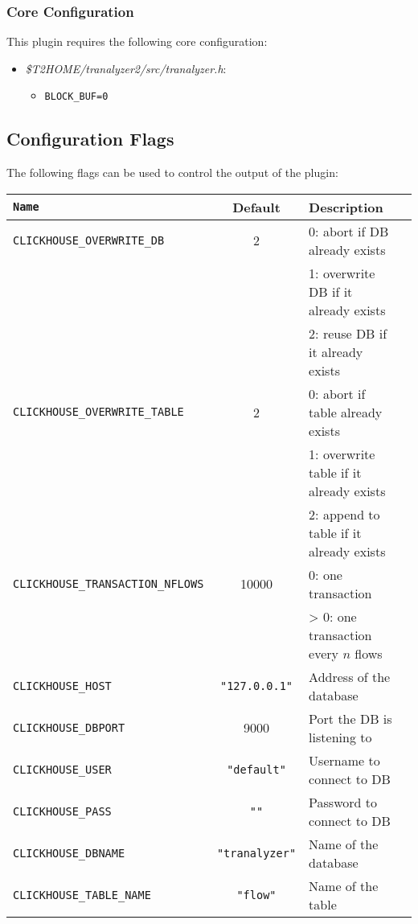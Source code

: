 \documentclass[documentation]{subfiles}
\begin{document}
\subsubsection{Core Configuration}
This plugin requires the following core configuration:
\begin{itemize}
    \item {\em \$T2HOME/tranalyzer2/src/tranalyzer.h}:
    \begin{itemize}
        \item {\tt BLOCK\_BUF=0}
    \end{itemize}
\end{itemize}

\subsection{Configuration Flags}
The following flags can be used to control the output of the plugin:
\begin{longtable}{>{\tt}lcl>{\tt\small}l}
    \toprule
    {\bf Name}                      & {\bf Default}            & {\bf Description}\\
    \midrule\endhead%
    CLICKHOUSE\_OVERWRITE\_DB       & 2                        & 0: abort if DB already exists\\
                                    &                          & 1: overwrite DB if it already exists\\
                                    &                          & 2: reuse DB if it already exists\\
    CLICKHOUSE\_OVERWRITE\_TABLE    & 2                        & 0: abort if table already exists\\
                                    &                          & 1: overwrite table if it already exists\\
                                    &                          & 2: append to table if it already exists\\
    CLICKHOUSE\_TRANSACTION\_NFLOWS & 10000                    & 0: one transaction\\
                                    &                          & > 0: one transaction every $n$ flows\\
    CLICKHOUSE\_HOST                & {\tt\small "127.0.0.1"}  & Address of the database\\
    CLICKHOUSE\_DBPORT              & 9000                     & Port the DB is listening to\\
    CLICKHOUSE\_USER                & {\tt\small "default"}    & Username to connect to DB\\
    CLICKHOUSE\_PASS                & {\tt\small ""}           & Password to connect to DB\\
    CLICKHOUSE\_DBNAME              & {\tt\small "tranalyzer"} & Name of the database\\
    CLICKHOUSE\_TABLE\_NAME         & {\tt\small "flow"}       & Name of the table\\
    \bottomrule
\end{longtable}
\end{document}
